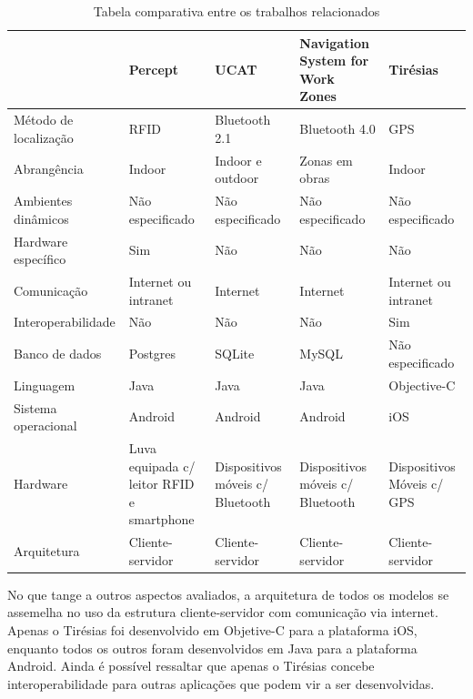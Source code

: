 \documentclass[english,brazilian]{UNISINOSmonografia}
\begin{document}
\FloatBarrier
\begin{table}
	\caption{Tabela comparativa entre os trabalhos relacionados}
	\label{tab:trabalalhosRelacionados}
	\centering%
	\begin{minipage}{1\textwidth}
		\begin{tabular}{ p{3cm} | p{3cm} | p{3cm} | p{3cm} | p{3cm} }
			\hline
										& Percept 									& UCAT 								& Navigation System for Work Zones		& Tirésias   \\ \hline
				Método de localização 	& RFID 										& Bluetooth 2.1 					& Bluetooth 4.0 						& GPS 						 \\ \hline
				Abrangência 			& Indoor 									& Indoor e outdoor 					& Zonas em obras 						& Indoor 					 \\ \hline
				Ambientes dinâmicos		& Não especificado							& Não especificado					& Não especificado						& Não especificado			 \\ \hline
				Hardware específico 	& Sim 										& Não 								& Não 									& Não 						 \\ \hline
				Comunicação 			& Internet ou intranet 						& Internet 							& Internet 								& Internet ou intranet 		 \\ \hline
				Interoperabilidade 		& Não 										& Não 								& Não 									& Sim 						 \\ \hline
				Banco de dados 			& Postgres 									& SQLite 							& MySQL 								& Não especificado 			 \\ \hline
				Linguagem 				& Java 										& Java 								& Java 									& Objective-C 				 \\ \hline
				Sistema operacional 	& Android 									& Android 							& Android 								& iOS 						 \\ \hline
				Hardware 				& Luva equipada c/ leitor RFID e smartphone & Dispositivos móveis c/ Bluetooth 	& Dispositivos móveis c/ Bluetooth 		& Dispositivos Móveis c/ GPS \\ \hline
				Arquitetura 			& Cliente-servidor 							& Cliente-servidor 					& Cliente-servidor 						& Cliente-servidor 			 \\ \hline
		\end{tabular}
	\end{minipage}
\end{table}
\FloatBarrier

No que tange a outros aspectos avaliados, a arquitetura de todos os modelos se assemelha no uso da estrutura cliente-servidor com comunicação via internet. Apenas o Tirésias foi desenvolvido em Objetive-C para a plataforma iOS, enquanto todos os outros foram desenvolvidos em Java para a plataforma Android. Ainda é possível ressaltar que apenas o Tirésias concebe interoperabilidade para outras aplicações que podem vir a ser desenvolvidas.
\end{document}

